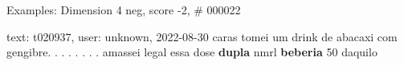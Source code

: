 \begin{frame}{Examples: Dimension 4 neg, score -2, \# 000022}
\footnotesize
\begin{alertblock}{text: t020937, user: unknown, 2022-08-30}
caras tomei um drink de abacaxi com gengibre. . . . . . . . amassei legal essa 
dose \textbf{dupla} nmrl \textbf{beberia} 50 daquilo 
\end{alertblock}
\end{frame}

